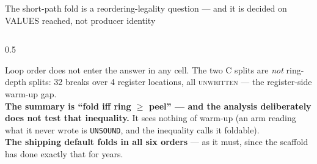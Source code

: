 \documentclass[aspectratio=169,9pt]{beamer}
\newcommand{\tsub}[1]{{\footnotesize\color{gray}#1}}
\newcommand{\good}[1]{\textcolor{ok}{\textbf{#1}}}
\begin{document}
\begin{frame}{The short-path fold is a reordering-legality question --- and it is decided on VALUES reached, not producer identity}
\begin{columns}[T]
\begin{column}{0.5\textwidth}
\begin{center}
\end{center}
\tsub{Loop order does not enter the answer in any cell. The two C splits are \emph{not} ring-depth splits: 32 breaks
over 4 register locations, all \textsc{unwritten} --- the register-side warm-up gap.}\\[3pt]
\textbf{The summary is ``fold iff ring $\ge$ peel'' --- and the analysis deliberately does not test that
inequality.} It sees nothing of warm-up (an arm reading what it never wrote is \texttt{UNSOUND}, and the
inequality calls it foldable).\\[3pt]
\tsub{\good{The shipping default folds in all six orders} --- as it must, since the scaffold has done exactly
that for years.}
\end{column}
\end{columns}
\end{frame}
\end{document}
